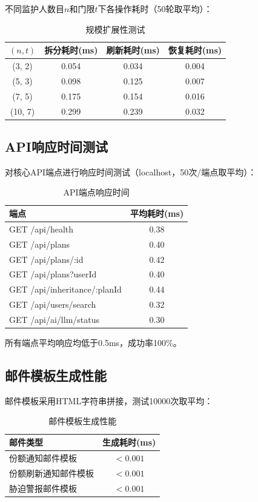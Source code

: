\documentclass[UTF8,a4paper,zihao=-4,openany]{ctexrep}
\begin{document}
不同监护人数目$n$和门限$t$下各操作耗时（50轮取平均）：

\begin{table}[htbp]
\centering
\caption{规模扩展性测试}
\label{tab:scalability}
\begin{tabularx}{\textwidth}{cccc}
\toprule
$(n, t)$ & 拆分耗时(ms) & 刷新耗时(ms) & 恢复耗时(ms)\\
\midrule
(3, 2) & 0.054 & 0.034 & 0.004\\
(5, 3) & 0.098 & 0.125 & 0.007\\
(7, 5) & 0.175 & 0.154 & 0.016\\
(10, 7) & 0.299 & 0.239 & 0.032\\
\bottomrule
\end{tabularx}
\end{table}

\subsection{API响应时间测试}

对核心API端点进行响应时间测试（localhost，50次/端点取平均）：

\begin{table}[htbp]
\centering
\caption{API端点响应时间}
\label{tab:api_perf}
\begin{tabularx}{\textwidth}{lc}
\toprule
端点 & 平均耗时(ms)\\
\midrule
GET /api/health & 0.38\\
GET /api/plans & 0.40\\
GET /api/plans/:id & 0.42\\
GET /api/plans?userId & 0.40\\
GET /api/inheritance/:planId & 0.44\\
GET /api/users/search & 0.32\\
GET /api/ai/llm/status & 0.30\\
\bottomrule
\end{tabularx}
\end{table}

所有端点平均响应均低于0.5ms，成功率100\%。

\subsection{邮件模板生成性能}

邮件模板采用HTML字符串拼接，测试10000次取平均：

\begin{table}[htbp]
\centering
\caption{邮件模板生成性能}
\label{tab:email_perf}
\begin{tabularx}{\textwidth}{lc}
\toprule
邮件类型 & 生成耗时(ms)\\
\midrule
份额通知邮件模板 & $< 0.001$\\
份额刷新通知邮件模板 & $< 0.001$\\
胁迫警报邮件模板 & $< 0.001$\\
\bottomrule
\end{tabularx}
\end{table}
\end{document}
